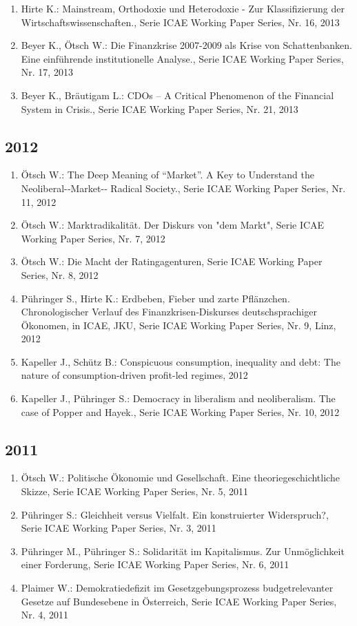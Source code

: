 \begin{enumerate}
	 \item Hirte K.: Mainstream, Orthodoxie und Heterodoxie - Zur Klassifizierung der Wirtschaftswissenschaften., Serie ICAE Working Paper Series, Nr. 16, 2013
	 \item Beyer K., Ötsch W.: Die Finanzkrise 2007-2009 als Krise von Schattenbanken. Eine einführende institutionelle Analyse., Serie ICAE Working Paper Series, Nr. 17, 2013
	 \item Beyer K., Bräutigam L.: CDOs – A Critical Phenomenon of the Financial System in Crisis., Serie ICAE Working Paper Series, Nr. 21, 2013
\end{enumerate}
\subsection*{2012}
\begin{enumerate}
    	 \item Ötsch W.: The Deep Meaning of “Market”. A Key to Understand the Neoliberal-­‐Market-­‐ Radical Society., Serie ICAE Working Paper Series, Nr. 11, 2012
	 \item Ötsch W.: Marktradikalität. Der Diskurs von "dem Markt", Serie ICAE Working Paper Series, Nr. 7, 2012
	 \item Ötsch W.: Die Macht der Ratingagenturen, Serie ICAE Working Paper Series, Nr. 8, 2012
	 \item Pühringer S., Hirte K.: Erdbeben, Fieber und zarte Pflänzchen. Chronologischer Verlauf des Finanzkrisen‐Diskurses deutschsprachiger Ökonomen, in ICAE, JKU, Serie ICAE Working Paper Series, Nr. 9, Linz, 2012
	 \item Kapeller J., Schütz B.: Conspicuous consumption, inequality and debt: The nature of consumption-driven profit-led regimes, 2012
	 \item Kapeller J., Pühringer S.: Democracy in liberalism and neoliberalism. The case of Popper and Hayek., Serie ICAE Working Paper Series, Nr. 10, 2012
\end{enumerate}
\subsection*{2011}
\begin{enumerate}
    	 \item Ötsch W.: Politische Ökonomie und Gesellschaft. Eine theoriegeschichtliche Skizze, Serie ICAE Working Paper Series, Nr. 5, 2011
	 \item Pühringer S.: Gleichheit versus Vielfalt. Ein konstruierter Widerspruch?, Serie ICAE Working Paper Series, Nr. 3, 2011
	 \item Pühringer M., Pühringer S.: Solidarität im Kapitalismus. Zur Unmöglichkeit einer Forderung, Serie ICAE Working Paper Series, Nr. 6, 2011
	 \item Plaimer W.: Demokratiedefizit im Gesetzgebungsprozess budgetrelevanter Gesetze auf Bundesebene in Österreich, Serie ICAE Working Paper Series, Nr. 4, 2011
\end{enumerate}
